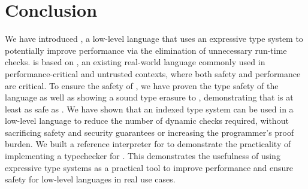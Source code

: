 \chapter{Conclusion}
\label{chp:conclusion}
We have introduced \name, a low-level language that uses an expressive type system to potentially improve performance via the elimination of unnecessary run-time checks.
\name is based on \wasm, an existing real-world language commonly used in performance-critical and untrusted contexts, where both safety and performance are critical.
To ensure the safety of \name, we have proven the type safety of the \name language as well as showing a sound type erasure to \wasm, demonstrating that \name is at least as safe as \wasm.
We have shown that an indexed type system can be used in a low-level language to reduce the number of dynamic checks required, without sacrificing safety and security guarantees or increasing the programmer's proof burden.
We built a reference interpreter for \name to demonstrate the practicality of implementing a typechecker for \name.
This demonstrates the usefulness of using expressive type systems as a practical tool to improve performance and ensure safety for low-level languages in real use cases.
